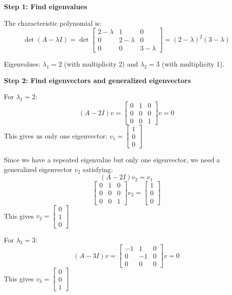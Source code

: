 \documentclass[11pt,a4paper]{article}
\begin{document}
\textbf{Step 1: Find eigenvalues}

The characteristic polynomial is:
\begin{equation}
	\det(A - \lambda I) = \det\begin{bmatrix} 2-\lambda & 1 & 0 \\ 0 & 2-\lambda & 0 \\ 0 & 0 & 3-\lambda \end{bmatrix} = (2-\lambda)^2(3-\lambda)
\end{equation}

Eigenvalues: $\lambda_1 = 2$ (with multiplicity 2) and $\lambda_2 = 3$ (with multiplicity 1).

\textbf{Step 2: Find eigenvectors and generalized eigenvectors}

For $\lambda_1 = 2$:
\begin{equation}
	(A - 2I)v = \begin{bmatrix} 0 & 1 & 0 \\ 0 & 0 & 0 \\ 0 & 0 & 1 \end{bmatrix}v = 0
\end{equation}
This gives us only one eigenvector: $v_1 = \begin{bmatrix} 1 \\ 0 \\ 0 \end{bmatrix}$

Since we have a repeated eigenvalue but only one eigenvector, we need a generalized eigenvector $v_2$ satisfying:
\begin{equation}
	(A - 2I)v_2 = v_1
\end{equation}
\begin{equation}
	\begin{bmatrix} 0 & 1 & 0 \\ 0 & 0 & 0 \\ 0 & 0 & 1 \end{bmatrix}v_2 = \begin{bmatrix} 1 \\ 0 \\ 0 \end{bmatrix}
\end{equation}
This gives $v_2 = \begin{bmatrix} 0 \\ 1 \\ 0 \end{bmatrix}$

For $\lambda_2 = 3$:
\begin{equation}
	(A - 3I)v = \begin{bmatrix} -1 & 1 & 0 \\ 0 & -1 & 0 \\ 0 & 0 & 0 \end{bmatrix}v = 0
\end{equation}
This gives $v_3 = \begin{bmatrix} 0 \\ 0 \\ 1 \end{bmatrix}$
\end{document}
